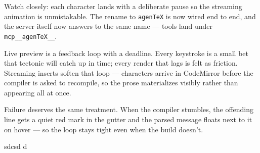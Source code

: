 \documentclass[11pt]{article}
\begin{document}
Watch closely: each character lands with a deliberate pause so the streaming animation is unmistakable. The rename to \texttt{agenTeX} is now wired end to end, and the server itself now answers to the same name --- tools land under \texttt{mcp\_\_agenTeX\_\_}. \cite{Menzo:2025cim}

Live preview is a feedback loop with a deadline. Every keystroke is a small bet that tectonic will catch up in time; every render that lags is felt as friction. Streaming inserts soften that loop --- characters arrive in CodeMirror before the compiler is asked to recompile, so the prose materializes visibly rather than appearing all at once.

Failure deserves the same treatment. When the compiler stumbles, the offending line gets a quiet red mark in the gutter and the parsed message floats next to it on hover --- so the loop stays tight even when the build doesn't.



sdcsd d
\end{document}

